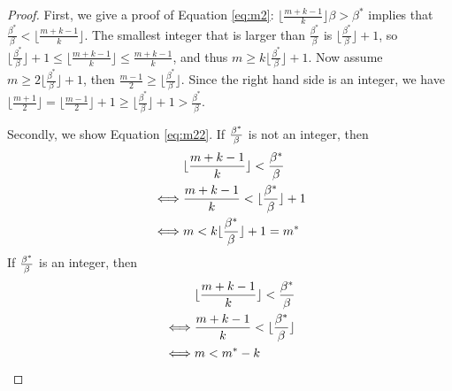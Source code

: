 \documentclass{article}
\begin{document}
\begin{proof}
	First, we give a proof of Equation \eqref{eq:m2}: $\lfloor \frac{m+k-1}{k} \rfloor \beta>\beta^\ast$
	implies that $\frac{\beta^\ast}{\beta}<\lfloor \frac{m+k-1}{k} \rfloor$.
	The smallest integer that is larger than $\frac{\beta^\ast}{\beta}$ is
	$\lfloor \frac{\beta^\ast}{\beta}\rfloor +1$,
	so $\lfloor \frac{\beta^\ast}{\beta} \rfloor + 1 \le \lfloor \frac{m+k-1}{k} \rfloor\le \frac{m+k-1}{k}$,
	and thus $m\ge k \Big\lfloor \frac{\beta^\ast}{\beta} \Big\rfloor +1$.
	Now assume $m\ge 2 \Big\lfloor \frac{\beta^\ast}{\beta} \Big\rfloor +1$,
	then $\frac{m-1}{2} \ge \lfloor \frac{\beta^\ast}{\beta} \rfloor$.
	Since the right hand side is an integer,
	we have $\lfloor \frac{m+1}{2} \rfloor = \lfloor \frac{m-1}{2} \rfloor +1 
	\ge \lfloor \frac{\beta^\ast}{\beta} \rfloor +1 >\frac{\beta^\ast}{\beta}$.
	
	Secondly, we show Equation \eqref{eq:m22}. If $\beta^\ast \over \beta$ is not an integer, then
	\begin{align*}
	& \lfloor \frac{m+k-1}{k} \rfloor < {\beta^\ast \over \beta}  \\
	\iff & \frac{m+k-1}{k}  < \lfloor{\beta^\ast \over \beta}\rfloor + 1 \\
	\iff & m < k \lfloor \frac{\beta^\ast}{\beta} \rfloor  + 1 = m^*
	\end{align*}
	If  $\beta^\ast \over \beta$ is an integer, then
	\begin{align*}
	& \lfloor  \frac{m+k-1}{k}  \rfloor < {\beta^\ast \over \beta}  \\
	\iff & \frac{m+k-1}{k}  < \lfloor{\beta^\ast \over \beta}\rfloor \\
	\iff & m <  m^* - k
	\end{align*}
\end{proof}


\end{document}
